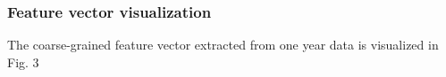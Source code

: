 \documentclass[a4paper, 10pt, conference]{ieeeconf}      %
\begin{document}
\subsubsection{Feature vector visualization}The coarse-grained feature vector extracted from one year data is visualized in Fig. 3
\begin{figure}[htbp]
    \centering
\end{figure}
\end{document}

